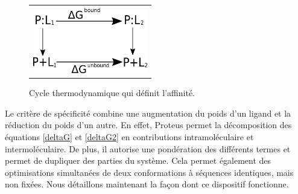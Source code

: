    \begin{figure}[!htbp]
     \centering
     \begin{tabular}{c}
       \includegraphics[width=5cm]{figure/cycleThermoLigand.png} 
     \end{tabular}
     \caption{Cycle thermodynamique qui définit l'affinité.}
\label{fig:cycleThermoLigand}
   \end{figure}
Le critère de spécificité combine une augmentation du poids d'un ligand et la réduction du poids d'un autre. En effet, Proteus permet la décomposition des équations \ref{deltaG} et \ref{deltaG2} en contributions intramoléculaire et intermoléculaire. De plus, il autorise une pondération des différents termes et permet de dupliquer des parties du système. Cela permet également des optimisations simultanées de deux conformations à séquences identiques, mais non fixées. Nous détaillons maintenant la façon dont ce dispositif fonctionne.

